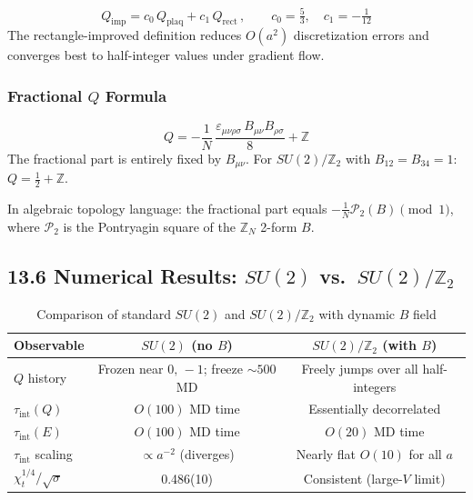 \documentclass[12pt,a4paper]{article}
\begin{document}
\begin{equation}
  Q_\mathrm{imp} = c_0\,Q_\mathrm{plaq} + c_1\,Q_\mathrm{rect}\,,
  \qquad c_0=\tfrac{5}{3},\quad c_1=-\tfrac{1}{12}
\end{equation}
The rectangle-improved definition reduces $O(a^2)$ discretization errors
and converges best to half-integer values under gradient flow.

\subsubsection*{Fractional $Q$ Formula}

\begin{equation}
  Q = -\frac{1}{N}\,\frac{\varepsilon_{\mu\nu\rho\sigma}\,B_{\mu\nu}B_{\rho\sigma}}{8}
      + \mathbb{Z}
\end{equation}
The fractional part is entirely fixed by $B_{\mu\nu}$.
For $SU(2)/\mathbb{Z}_2$ with $B_{12}=B_{34}=1$: $Q=\tfrac{1}{2}+\mathbb{Z}$.

In algebraic topology language: the fractional part equals
$-\frac{1}{N}\mathcal{P}_2(B)\pmod{1}$,
where $\mathcal{P}_2$ is the Pontryagin square of the $\mathbb{Z}_N$ 2-form $B$.

\subsection*{13.6 Numerical Results: $SU(2)$ vs.\ $SU(2)/\mathbb{Z}_2$}

\begin{table}[H]
\centering
\caption{Comparison of standard $SU(2)$ and $SU(2)/\mathbb{Z}_2$ with dynamic $B$ field}
\begin{tabular}{|l|c|c|}
\hline
Observable & $SU(2)$ (no $B$) & $SU(2)/\mathbb{Z}_2$ (with $B$) \\
\hline
$Q$ history & Frozen near $0,\,-1$; freeze $\sim 500$ MD & Freely jumps over all half-integers \\
$\tau_\mathrm{int}(Q)$ & $O(100)$ MD time & Essentially decorrelated \\
$\tau_\mathrm{int}(E)$ & $O(100)$ MD time & $O(20)$ MD time \\
$\tau_\mathrm{int}$ scaling & $\propto a^{-2}$ (diverges) & Nearly flat $O(10)$ for all $a$ \\
$\chi_t^{1/4}/\sqrt{\sigma}$ & 0.486(10) & Consistent (large-$V$ limit) \\
\hline
\end{tabular}
\end{table}
\end{document}
